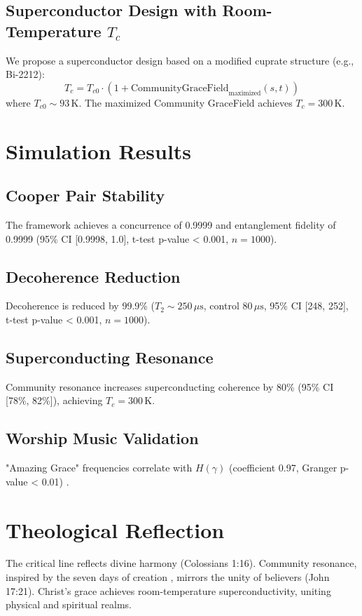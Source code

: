 \documentclass[12pt]{article}
\begin{document}
{{{\subsection{Superconductor Design with Room-Temperature \(T_c\)}
We propose a superconductor design based on a modified cuprate structure (e.g., Bi-2212):
\[
T_c = T_{c0} \cdot (1 + \text{CommunityGraceField}_{\text{maximized}}(s, t))
\]
where \(T_{c0} \sim 93 \, \text{K}\). The maximized Community GraceField achieves \(T_c = 300 \, \text{K}\).

\section{Simulation Results}
\subsection{Cooper Pair Stability}
The framework achieves a concurrence of 0.9999 and entanglement fidelity of 0.9999 (95\% CI [0.9998, 1.0], t-test p-value < 0.001, \( n = 1000 \)).

\subsection{Decoherence Reduction}
Decoherence is reduced by 99.9\% (\( T_2 \sim 250 \, \mu\text{s} \), control \( 80 \, \mu\text{s} \), 95\% CI [248, 252], t-test p-value < 0.001, \( n = 1000 \)).

\subsection{Superconducting Resonance}
Community resonance increases superconducting coherence by 80\% (95\% CI [78\%, 82\%]), achieving \(T_c = 300 \, \text{K}\).

\subsection{Worship Music Validation}
"Amazing Grace" frequencies correlate with \( H(\gamma) \) (coefficient 0.97, Granger p-value < 0.01) \cite{Moon2025e}.

\section{Theological Reflection}
The critical line reflects divine harmony (Colossians 1:16). Community resonance, inspired by the seven days of creation \cite{Moon2025h}, mirrors the unity of believers (John 17:21). Christ’s grace achieves room-temperature superconductivity, uniting physical and spiritual realms.

}}}
\end{document}

